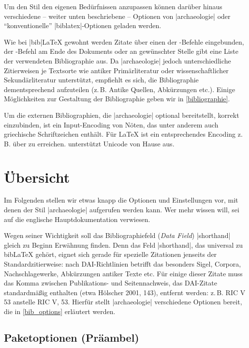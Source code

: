 \documentclass[a4paper,10pt,ngerman]{ltxdoc}
\begin{document}
Um den Stil den eigenen Bedürfnissen anzupassen können darüber hinaus verschiedene -- weiter unten beschriebene -- Optionen von |archaeologie| oder \enquote{konventionelle} |biblatex|-Optionen geladen werden.

Wie bei |bib|\LaTeX{} gewohnt werden Zitate über einen der -Befehle eingebunden, der -Befehl am Ende des Dokuments oder an gewünschter Stelle gibt eine Liste der verwendeten Bibliographie aus. Da |archaeologie| jedoch unterschiedliche Zitierweisen je Textsorte wie antiker Primärliteratur oder wissenschaftlicher Sekundärliteratur unterstützt, empfiehlt es sich, die Bibliographie dementsprechend aufzuteilen (z.\,B. Antike Quellen, Abkürzungen etc.). 
Einige Möglichkeiten zur Gestaltung der Bibliographie geben wir in \cref{bibliographie}.

Um die externen Bibliographien, die |archaeologie| optional bereitstellt, korrekt einzubinden, ist ein Input-Encoding von Nöten, das unter anderem auch griechische Schriftzeichen enthält. 
Für \LaTeX{} ist ein entsprechendes Encoding z.\,B. über  zu erreichen. \XeLaTeX{} unterstützt Unicode von Hause aus.

\section{Übersicht}
Im Folgenden stellen wir etwas knapp die Optionen und Einstellungen vor, mit denen der Stil |archaeologie| aufgerufen werden kann. Wer mehr wissen will, sei auf die englische Hauptdokumentation verwiesen. 

  Wegen seiner Wichtigkeit soll das Bibliographiefeld (\emph{Data Field}) |shorthand| gleich zu Beginn Erwähnung finden. Denn das Feld |shorthand|, das universal zu bib\LaTeX{} gehört, eignet sich gerade für spezielle Zitationen jenseits der Standardzitierweise: nach DAI-Richtlinien betrifft das besonders Sigel, Corpora, Nachschlagewerke, Abkürzungen antiker Texte etc. Für einige dieser Zitate muss das Komma zwischen Publikations- und Seitennachweis, das DAI-Zitate standardmäßig enthalten (etwa Hölscher 2001, 143), entfernt werden: z.\,B. RIC V 53 anstelle RIC V, 53. Hierfür stellt |archaeologie| verschiedene Optionen bereit, die in \cref{bib_options} erläutert werden.

\subsection{Paketoptionen (Präambel)}\label{preamble_options}
\end{document}
